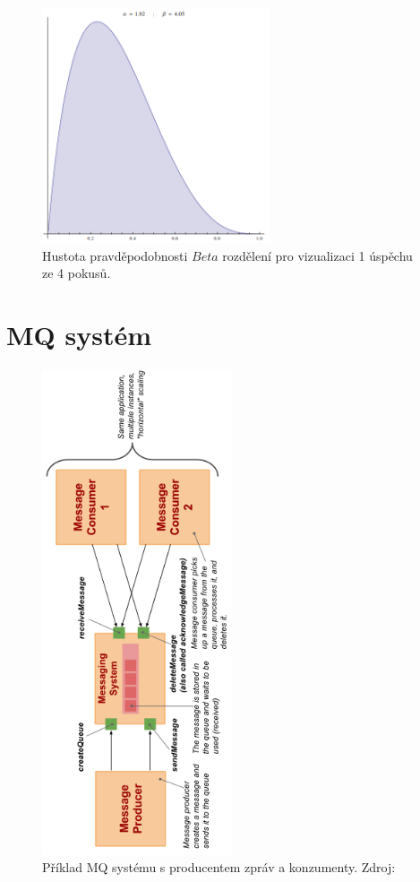 \documentclass[thesis=M,czech]{FITthesis}[2014/05/07]
\begin{document}
\begin{figure}\centering
	\includegraphics[width=0.6\textwidth]{obr/beta2.png}
 	\caption[Hustota pravděpodobnosti $Beta$ rozdělení pro vizualizaci 1 úspěchu ze 4 pokusů.]{Hustota pravděpodobnosti $Beta$ rozdělení pro vizualizaci 1 úspěchu ze 4 pokusů.}\label{fig:beta2}
\end{figure}	

\section{MQ systém}

\begin{figure}\centering
	\includegraphics[width=0.5\textwidth]{obr/vitvar_mq.png}
 	\caption[Příklad MQ systému s producentem zpráv a konzumenty]{Příklad MQ systému s producentem zpráv a konzumenty. Zdroj: \cite{vitvarMq}}\label{fig:vitvarMq}
\end{figure}	
\end{document}
